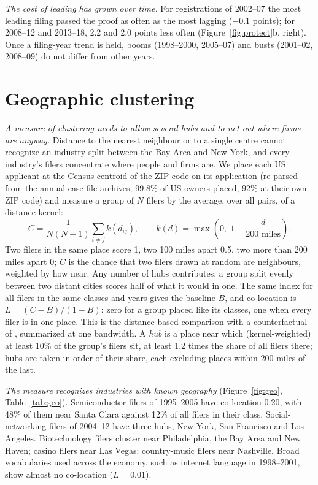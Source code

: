 \emph{The cost of leading has grown over time.} For registrations of
2002--07 the most leading filing passed the proof as often as the most
lagging ($-0.1$ points); for 2008--12 and 2013--18, 2.2 and 2.0 points less
often (Figure~\ref{fig:protect}b, right). Once a filing-year trend is
held, booms (1998--2000, 2005--07) and busts (2001--02, 2008--09) do not
differ from other years.

\section{Geographic clustering}\label{sec:geo}

\emph{A measure of clustering needs to allow several hubs and to net out
where firms are anyway.} Distance to the nearest neighbour or to a
single centre cannot recognize an industry split between the Bay Area
and New York, and every industry's filers concentrate where people and
firms are. We place each US applicant at the Census centroid of the ZIP
code on its application (re-parsed from the annual case-file archives;
99.8\% of US owners placed, 92\% at their own ZIP code) and measure a
group of $N$ filers by the average, over all pairs, of a distance kernel:
\[
C = \frac{1}{N(N-1)}\sum_{i \neq j} k(d_{ij}), \qquad
k(d) = \max\!\left(0,\; 1 - \frac{d}{200\text{ miles}}\right).
\]
Two filers in the same place score 1, two 100 miles apart 0.5, two more
than 200 miles apart 0; $C$ is the chance that two filers drawn at random
are neighbours, weighted by how near. Any number of hubs contributes: a
group split evenly between two distant cities scores half of what it
would in one. The same index for all filers in the same classes and
years gives the baseline $B$, and co-location is
$L = (C - B)/(1 - B)$: zero for a group placed like its classes, one when
every filer is in one place. This is the distance-based comparison with
a counterfactual of \citet{DurantonOverman2005}, summarized at one
bandwidth. A \emph{hub} is a place near which (kernel-weighted) at least
10\% of the group's filers sit, at least 1.2 times the share of all
filers there; hubs are taken in order of their share, each excluding
places within 200 miles of the last.

\emph{The measure recognizes industries with known geography}
(Figure~\ref{fig:geo}, Table~\ref{tab:geo}). Semiconductor filers of
1995--2005 have co-location 0.20, with 48\% of them near Santa Clara
against 12\% of all filers in their class. Social-networking filers of
2004--12 have three hubs, New York, San Francisco and Los Angeles.
Biotechnology filers cluster near Philadelphia, the Bay Area and New
Haven; casino filers near Las Vegas; country-music filers near
Nashville. Broad vocabularies used across the economy, such as internet
language in 1998--2001, show almost no co-location ($L = 0.01$).

